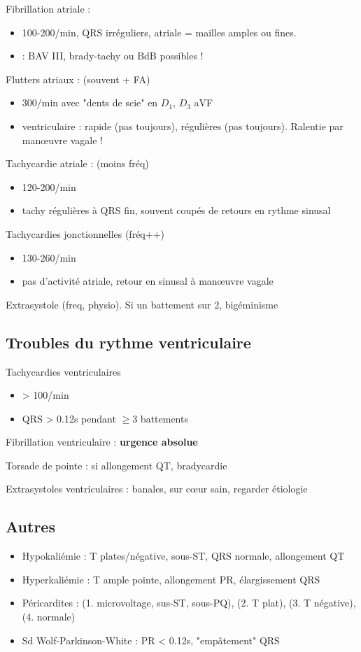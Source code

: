 Fibrillation atriale : 
\begin{itemize}
  \item 100-200/min, QRS irréguliers, atriale = mailles amples ou fines.
  \item \danger{} : BAV III, brady-tachy ou BdB possibles !
\end{itemize}
Flutters atriaux : (souvent + FA)
\begin{itemize}
  \item 300/min avec "dents de scie" en $D_1$, $D_3$ aVF
  \item ventriculaire : rapide (pas toujours), régulières (pas toujours).
    Ralentie par man\oe{}uvre vagale !
\end{itemize}
Tachycardie atriale : (moins fréq)
\begin{itemize}
  \item 120-200/min
  \item tachy régulières à QRS fin, souvent coupés de retours en rythme sinusal
\end{itemize}
Tachycardies jonctionnelles (fréq++)
\begin{itemize}
  \item 130-260/min
  \item pas d'activité atriale, retour en sinusal à man\oe{}uvre vagale
\end{itemize}
Extrasystole (freq, physio). Si un battement sur 2, bigéminisme

\subsection{Troubles du rythme ventriculaire}

Tachycardies ventriculaires
\begin{itemize}
  \item > 100/min
  \item QRS > 0.12s pendant $\ge 3$ battements
\end{itemize}
Fibrillation ventriculaire : \textbf{urgence absolue}  \skull

Torsade de pointe : si allongement QT, bradycardie

Extrasystoles ventriculaires : banales, sur c\oe{}ur sain, regarder étiologie

\subsection{Autres}
\begin{itemize}
  \item Hypokaliémie : T plates/négative, sous-ST, QRS normale, allongement QT
  \item Hyperkaliémie : T ample pointe, allongement PR, élargissement QRS
  \item Péricardites : (1. microvoltage, sus-ST, sous-PQ), (2. T plat), (3. T
    négative), (4. normale)
  \item Sd Wolf-Parkinson-White : PR < 0.12s, "empâtement" QRS
\end{itemize}

